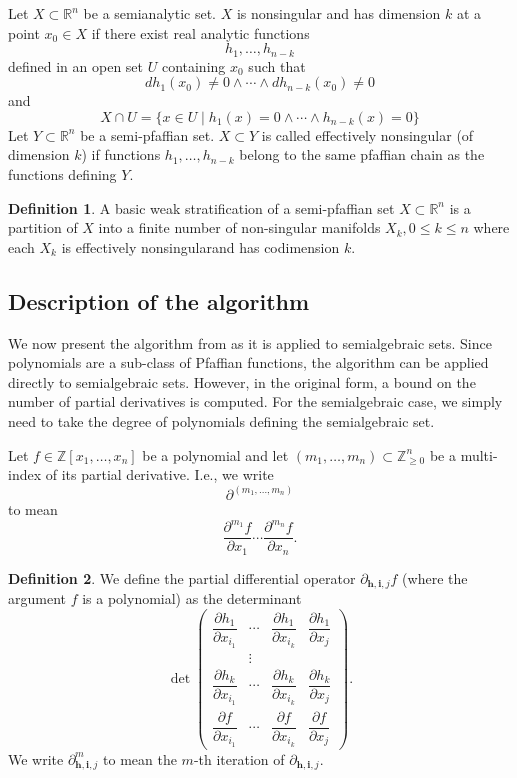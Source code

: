 \documentclass[
]{book}
\theoremstyle{definition}
\newtheorem{definition}{Definition}[chapter]
\theoremstyle{definition}
\theoremstyle{definition}
\theoremstyle{definition}
\theoremstyle{remark}
\begin{document}
Let \(X \subset \mathbb{R}^n\) be a semianalytic set. \(X\) is nonsingular and has dimension \(k\) at a point \(x_0 \in X\) if there exist real analytic functions \[
h_1,\ldots,h_{n-k}
\]
defined in an open set \(U\) containing \(x_0\) such that
\[
dh_1(x_0) \ne 0 \land \cdots \land  dh_{n-k}(x_0) \ne 0
\]
and
\[
X \cap U = \{ x \in U \mid h_1(x) = 0 \land \cdots \land h_{n-k}(x) = 0 \}
\]
Let \(Y \subset \mathbb{R}^n\) be a semi-pfaffian set.
\(X \subset Y\) is called effectively nonsingular (of dimension \(k\)) if functions \(h_1,\ldots,h_{n-k}\) belong to the same pfaffian chain as the functions defining \(Y\).

\begin{definition}
A basic weak stratification of a semi-pfaffian set \(X \subset \mathbb{R}^n\) is a partition of \(X\) into a finite number of non-singular manifolds \(X_k, 0 \le k \le n\) where each \(X_k\) is effectively nonsingularand has codimension \(k\).
\end{definition}

\hypertarget{description-of-the-algorithm}{%
\subsection{Description of the algorithm}\label{description-of-the-algorithm}}

We now present the algorithm from \citet{gv1995} as it is applied to semialgebraic sets. Since polynomials are a sub-class of Pfaffian functions, the algorithm can be applied directly to semialgebraic sets. However, in the original form, a bound on the number of partial derivatives is computed. For the semialgebraic case, we simply need to take the degree of polynomials defining the semialgebraic set.

Let \(f \in \mathbb{Z}[x_1,\ldots,x_n]\) be a polynomial and let \((m_1,\ldots,m_n) \subset \mathbb{Z}_{\ge 0}^n\) be a multi-index of its partial derivative. I.e., we write
\[
\partial^{(m_1,\ldots,m_n)}
\]
to mean
\[
\dfrac{\partial^{m_1} f}{\partial x_1} \cdots \dfrac{\partial^{m_n} f}{\partial x_n}.
\]

\begin{definition}
We define the partial differential operator \(\partial_{\mathbf{h}, \mathbf{i}, j} f\) (where the argument \(f\) is a polynomial) as the determinant
\[
\det\begin{pmatrix}\dfrac{\partial h_{1}}{\partial x_{i_{1}}} & \cdots & \dfrac{\partial h_{1}}{\partial x_{i_{k}}} & \dfrac{\partial h_{1}}{\partial x_{j}}\\
 & \vdots\\
\dfrac{\partial h_{k}}{\partial x_{i_{1}}} & \cdots & \dfrac{\partial h_{k}}{\partial x_{i_{k}}} & \dfrac{\partial h_{k}}{\partial x_{j}}\\
\dfrac{\partial f}{\partial x_{i_{1}}} & \cdots & \dfrac{\partial f}{\partial x_{i_{k}}} & \dfrac{\partial f}{\partial x_{j}}
\end{pmatrix}.
\]
We write \(\partial^m_{\mathbf{h}, \mathbf{i}, j}\) to mean the \(m\)-th iteration of \(\partial_{\mathbf{h}, \mathbf{i}, j}\).
\end{definition}
\end{document}

